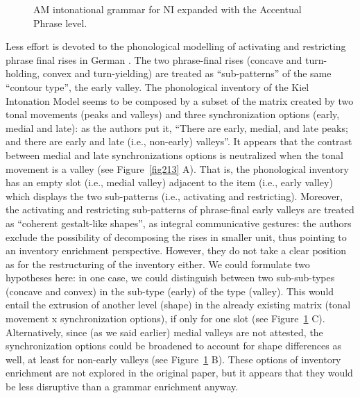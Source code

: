 \begin{figure}
\centering
{}
\caption{AM intonational grammar for NI expanded with the Accentual Phrase level.}
\label{fig212}\end{figure}

Less effort is devoted to the phonological modelling of activating and restricting phrase final rises in German \cite{dombrowski2005acoustic}. The two phrase-final rises (concave and turn-holding, convex and turn-yielding) are treated as ``sub-patterns'' of the same ``contour type'', the early valley. The phonological inventory of the Kiel Intonation Model seems to be composed by a subset of the matrix created by two tonal movements (peaks and valleys) and three synchronization options (early, medial and late): as the authors put it, ``There are early, medial, and late peaks; and there are early and late (i.e., non-early) valleys''. It appears that the contrast between medial and late synchronizations options is neutralized when the tonal movement is a valley (see Figure~\ref{fig213} A). That is, the phonological inventory has an empty slot (i.e., medial valley) adjacent to the item (i.e., early valley) which displays the two sub-patterns (i.e., activating and restricting). Moreover, the activating and restricting sub-patterns of phrase-final early valleys are treated as ``coherent gestalt-like shapes'', as integral communicative gestures: the authors exclude the possibility of decomposing the rises in smaller unit, thus pointing to an inventory enrichment perspective. However, they do not take a clear position as for the restructuring of the inventory either. We could formulate two hypotheses here: in one case, we could distinguish between two sub-sub-types (concave and convex) in the sub-type (early) of the type (valley). This would entail the extrusion of another level (shape) in the already existing matrix (tonal movement x synchronization options), if only for one slot (see Figure~\ref{fig212} C). Alternatively, since (as we said earlier) medial valleys are not attested, the synchronization options could be broadened to account for shape differences as well, at least for non-early valleys (see Figure~\ref{fig212} B). These options of inventory enrichment are not explored in the original paper, but it appears that they would be less disruptive than a grammar enrichment anyway.


